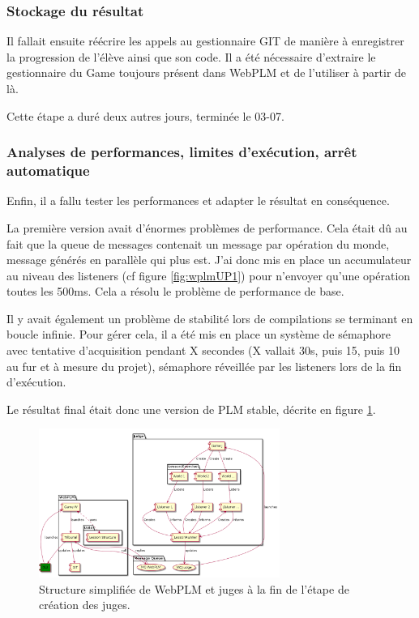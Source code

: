\documentclass[stage]{tnreport}
\begin{document}
\subsubsection{Stockage du résultat}
Il fallait ensuite réécrire les appels au gestionnaire GIT de manière à enregistrer la progression de l'élève ainsi que son code. Il a été nécessaire d'extraire le gestionnaire du Game toujours présent dans WebPLM et de l'utiliser à partir de là.

Cette étape a duré deux autres jours, terminée le 03-07.

\subsubsection{Analyses de performances, limites d'exécution, arrêt automatique}
Enfin, il a fallu tester les performances et adapter le résultat en conséquence.

La première version avait d'énormes problèmes de performance. Cela était dû au fait que la queue de messages contenait un message par opération du monde, message générés en parallèle qui plus est.
J'ai donc mis en place un accumulateur au niveau des listeners (cf figure \ref{fig:wplmUP1}) pour n'envoyer qu'une opération toutes les 500ms. Cela a résolu le problème de performance de base.

Il y avait également un problème de stabilité lors de compilations se terminant en boucle infinie. Pour gérer cela, il a été mis en place un système de sémaphore avec tentative d'acquisition pendant X secondes (X vallait 30s, puis 15, puis 10 au fur et à mesure du projet), sémaphore réveillée par les listeners lors de la fin d'exécution.

Le résultat final était donc une version de PLM stable, décrite en figure \ref{fig:wplmUP2}.
\begin{figure}[h]
	\centering
		\includegraphics[width=0.7\textwidth]{figures/WebPLM-uml-cp2}
	\caption{Structure simplifiée de WebPLM et juges à la fin de l'étape de création des juges.}
	\label{fig:wplmUP2}
\end{figure}
\end{document}
